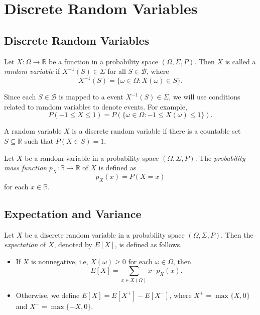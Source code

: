 \chapter{Discrete Random Variables}
\section{Discrete Random Variables}
\begin{definition}
  Let $X: \Omega \to \mathbb{R}$ be a function in a probability space
  $(\Omega, \Sigma, P)$.
  Then $X$ is called a \emph{random variable} if $X^{-1}(S) \in \Sigma$ for
  all $S \in \mathcal{B}$, where
  \begin{equation*}
    X^{-1}(S) = \{\omega \in \Omega : X(\omega) \in S\}.
  \end{equation*}
\end{definition}
\begin{remark}
  Since each $S \in \mathcal{B}$ is mapped to a event $X^{-1}(S) \in \Sigma$,
  we will use conditions related to ramdom variables to denote events.
  For example,
  \begin{equation*}
    P(-1 \leq X \leq 1) = P(\{\omega \in \Omega: -1 \leq X(\omega) \leq 1\}).
  \end{equation*}
\end{remark}

\begin{definition}
  A random variable $X$ is a discrete random variable if there is a countable
  set $S \subseteq \mathbb{R}$ such that $P(X \in S) = 1$. 
\end{definition}

\begin{definition}
  Let $X$ be a random variable in a probability space $(\Omega, \Sigma, P)$.
  The \emph{probability mass function} $p_X: \mathbb{R} \to \mathbb{R}$ of $X$
  is defined as
  \begin{equation*}
    p_X(x) = P(X = x)
  \end{equation*}
  for each $x \in \mathbb{R}$.
\end{definition}

\section{Expectation and Variance}
\begin{definition}
  Let $X$ be a discrete random variable in a probability space
  $(\Omega, \Sigma, P)$.
  Then the \emph{expectation} of $X$, denoted by $E[X]$, is defined as
  follows.
  \begin{itemize}
    \item If $X$ is nonnegative, i.e, $X(\omega) \geq 0$ for each
      $\omega \in \Omega$, then
      \begin{equation*}
        E[X] = \sum_{x \in X(\Omega)} x \cdot p_X(x).
      \end{equation*}
    \item Otherwise, we define $E[X] = E[X^+] - E[X^-]$,
      where $X^+ = \max\{X, 0\}$ and $X^- = \max\{-X, 0\}$.
  \end{itemize}
\end{definition}

